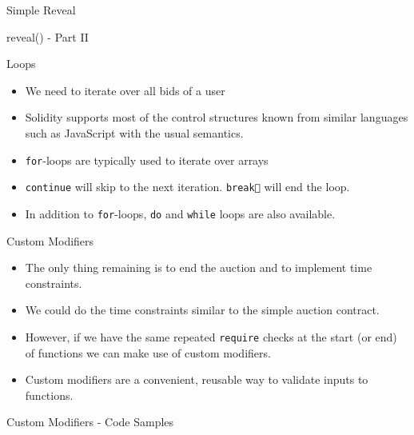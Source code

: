 \documentclass[]{beamer}
\begin{document}
\begin{frame}{Simple Reveal}
\vspace{.3cm}
	\begin{samplecode}{reveal() - Part II}
		
	\end{samplecode}
\end{frame}

\begin{frame}{Loops}
	\begin{itemize}
		\item<1->We need to iterate over all bids of a user
		\item<2->Solidity supports most of the control structures known from similar languages such as JavaScript with the usual semantics.
		\item<3->\texttt{for}-loops are typically used to iterate over arrays
		\item<5->\texttt{continue} will skip to the next iteration. \texttt{break} will end the loop.
		\item<6->In addition to \texttt{for}-loops, \texttt{do} and \texttt{while} loops are also available.
	\end{itemize}

	
\end{frame}

\begin{frame}{Custom Modifiers}
	\begin{itemize}
		\item<1-> The only thing remaining is to end the auction and to implement time constraints.
		\item<2-> We could do the time constraints similar to the simple auction contract.
		\item<3-> However, if we have the same repeated \texttt{require} checks at the start (or end) of functions we can make use of custom modifiers.
		\item<4-> Custom modifiers are a convenient, reusable way to validate inputs to functions.
	\end{itemize}
\end{frame}

\begin{frame}{Custom Modifiers - Code Samples}
	\uncover<1->{
	\begin{samplecode}{Only Before}
		
	\end{samplecode}
	}
	\uncover<2->{
	\begin{samplecode}{Only After}
		
	\end{samplecode}
	}
\end{frame}
\end{document}
